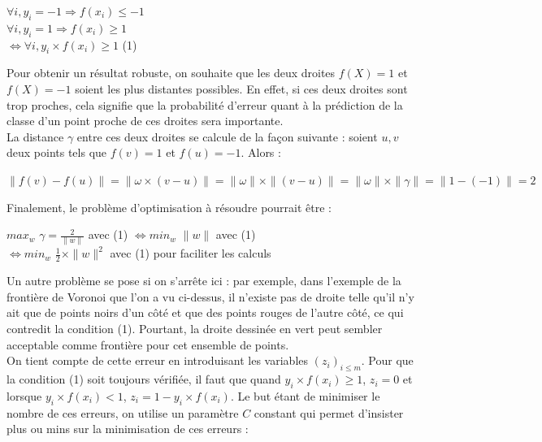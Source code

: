 \documentclass{article}
\begin{document}
         \begin{center}
         $\forall i, y_i = -1 \Rightarrow f(x_i) \leq -1$\\
         $\forall i, y_i = 1 \Rightarrow f(x_i) \geq 1$\\
         $\Leftrightarrow \forall i, y_i \times f(x_i) \geq 1$ (1)
         \end{center}

\newpage

Pour obtenir un résultat robuste, on souhaite que les deux droites $f(X) = 1$ et $f(X) = -1$ soient les plus distantes possibles. En effet, si ces deux droites sont trop proches, cela signifie que la probabilité d'erreur quant à la prédiction de la classe d'un point proche de ces droites sera importante.\\

La distance $\gamma$ entre ces deux droites se calcule de la façon suivante : soient $u, v$ deux points tels que $f(v) = 1$ et $f(u) = -1$. Alors :

      \begin{center}
      $\|f(v) - f(u)\| = \|\omega \times (v-u)\| = \|\omega\| \times \|(v-u)\| = \|\omega\| \times \|\gamma\| = \|1 - (-1)\| = 2$
      \end{center}

Finalement, le problème d'optimisation à résoudre pourrait être :\\
 
           \begin{centre}
           $max_{w}$ $\gamma = \frac{2}{\|w\|}$ avec (1) $\Leftrightarrow min_{w}$ $\|w\|$ avec (1)\\
           $\Leftrightarrow min_{w}$ $\frac{1}{2} \times \|w\|^2$ avec (1) pour faciliter les calculs
           \end{centre}

\bigskip

Un autre problème se pose si on s'arrête ici : par exemple, dans l'exemple de la frontière de Voronoi que l'on a vu ci-dessus, il n'existe pas de droite telle qu'il n'y ait que de points noirs d'un côté et que des points rouges de l'autre côté, ce qui contredit la condition (1). Pourtant, la droite dessinée en vert peut sembler acceptable comme frontière pour cet ensemble de points.\\

On tient compte de cette erreur en introduisant les variables $(z_i)_{i \leq m}$. Pour que la condition (1) soit toujours vérifiée, il faut que quand $y_i \times f(x_i) \geq 1$, $z_i = 0$ et lorsque $y_i \times f(x_i) < 1$, $z_i = 1 - y_i \times f(x_i)$. Le but étant de minimiser le nombre de ces erreurs, on utilise un paramètre $C$ constant qui permet d'insister plus ou mins sur la minimisation de ces erreurs :\\ 
\end{document}
